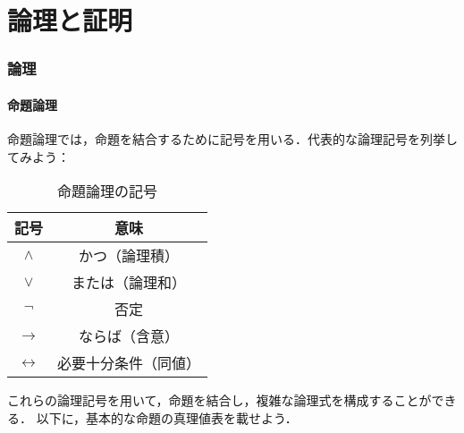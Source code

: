 \part*{論理と証明}
\section{論理}
\subsection{命題論理}

命題論理では，命題を結合するために記号を用いる．代表的な論理記号を列挙してみよう：

\begin{table}[ht]
  \centering
  \caption{命題論理の記号}
  \begin{tabular}{c|c}
    \hline
    記号                & 意味                       \\
    \hline
    $\land$           & かつ（論理積\index{ろんりせき@論理積}） \\
    $\lor$            & または（論理和\index{ろんりわ@論理和}） \\
    $\lnot$           & 否定\index{ひてい@否定}         \\
    $\to$             & ならば（含意\index{がんい@含意}）    \\
    $\leftrightarrow$ & 必要十分条件（同値）\index{どうち@同値} \\
    \hline
  \end{tabular}
\end{table}

これらの論理記号を用いて，命題を結合し，複雑な論理式を構成することができる．
以下に，基本的な命題の真理値表を載せよう．

